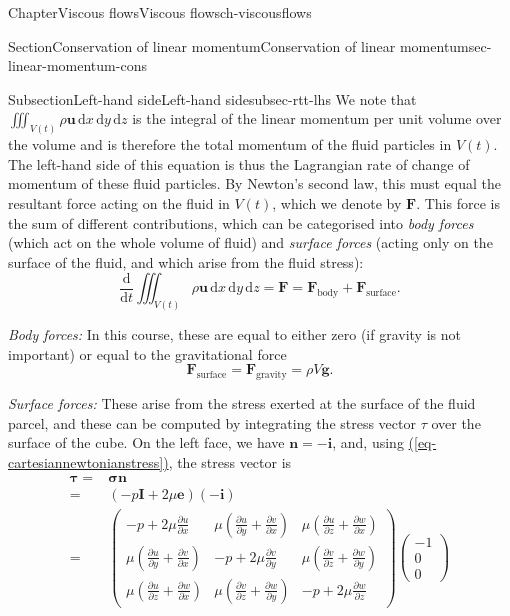 \documentclass[oneside,10pt,]{book}
\newcommand{\xreffont}{\relax}
\numberwithin{equation}{section}
\newcommand{\de}{\mathrm{d}}
\newcommand{\dd}[2]{\frac{\de#1}{\de#2}}
\newcommand{\pd}[2]{\frac{\partial#1}{\partial#2}}
\newcommand{\be}{\boldsymbol{e}}
\newcommand{\bn}{\boldsymbol{n}}
\newcommand{\bu}{\boldsymbol{u}}
\newcommand{\bg}{\boldsymbol{g}}
\newcommand{\bF}{\boldsymbol{F}}
\newcommand{\bsigma}{\boldsymbol{\sigma}}
\newcommand{\btau}{\boldsymbol{\tau}}
\newcommand{\bI}{\boldsymbol{I}}
\newcommand{\bi}{\boldsymbol{i}}
\begin{document}
\begin{chapterptx}{Chapter}{Viscous flows}{}{Viscous flows}{}{}{ch-viscousflows}
\begin{sectionptx}{Section}{Conservation of linear momentum}{}{Conservation of linear momentum}{}{}{sec-linear-momentum-cons}
\begin{subsectionptx}{Subsection}{Left-hand side}{}{Left-hand side}{}{}{subsec-rtt-lhs}
We note that \(\iiint_{V(t)} \rho\bu \, \de{x} \, \de{y} \, \de{z}\) is the integral of the linear momentum per unit volume over the volume and is therefore the total momentum of the fluid particles in \(V(t)\). The left-hand side of this equation is thus the Lagrangian rate of change of momentum of these fluid particles. By Newton's second law, this must equal the resultant force acting on the fluid in \(V(t)\), which we denote by \(\bF\). This force is the sum of different contributions, which can be categorised into \emph{body forces} (which act on the whole volume of fluid) and \emph{surface forces} (acting only on the surface of the fluid, and which arise from the fluid stress):%
\begin{equation*}
\dd{}{t} \iiint_{V(t)} \rho\bu \, \de{x} \, \de{y} \, \de{z}
= \bF
= \bF_{\textrm{body}} + \bF_{\textrm{surface}}.
\end{equation*}
%
\par
\emph{Body forces:} In this course, these are equal to either zero (if gravity is not important) or equal to the gravitational force%
\begin{equation*}
\bF_{\textrm{surface}}=\bF_{\textrm{gravity}}=\rho V\bg.
\end{equation*}
%
\par
\emph{Surface forces:} These arise from the stress exerted at the surface of the fluid parcel, and these can be computed by integrating the stress vector \(\tau\) over the surface of the cube. On the left face, we have \(\bn=-\bi\), and, using  \hyperref[eq-cartesiannewtonianstress]{({\xreffont\ref{eq-cartesiannewtonianstress}})}, the stress vector is%
\begin{align*}
\btau=&\bsigma\bn\\
=&\left(-p\bI+2\mu\be\right)\left(-\bi\right)\\
=&\left(\begin{matrix}
-p+2\mu\pd{u}{x}&\mu\left(\pd{u}{y}+\pd{v}{x}\right)&\mu\left(\pd{u}{z}+\pd{w}{x}\right)\\
\mu\left(\pd{u}{y}+\pd{v}{x}\right)&-p+2\mu\pd{v}{y}&\mu\left(\pd{v}{z}+\pd{w}{y}\right)\\
\mu\left(\pd{u}{z}+\pd{w}{x}\right)&\mu\left(\pd{v}{z}+\pd{w}{y}\right)&-p+2\mu\pd{w}{z}
\end{matrix}\right)
\left(\begin{matrix}-1\\0\\0\end{matrix}\right)\\

\end{align*}
\end{subsectionptx}
\end{sectionptx}
\end{chapterptx}
\end{document}
